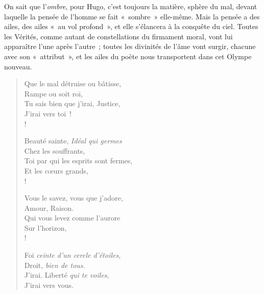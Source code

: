 \documentclass[french,twoside]{book} %
\begin{document}
\noindent On sait que l’\emph{ombre}, pour Hugo, c’est toujours la matière, sphère du mal, devant laquelle la pensée de l’homme se fait « sombre » elle-même. Mais la pensée a des ailes, des ailes « au vol profond », et elle s’élancera à la conquête du ciel. Toutes les Vérités, comme autant de constellations du firmament moral, vont lui apparaître l’une après l’autre ; toutes les divinités de l’âme vont surgir, chacune avec son « attribut », et les ailes du poète nous transportent dans cet Olympe nouveau.\par


\begin{verse}
Que le mal détruise ou bâtisse,\\
Rampe ou soit roi,\\
Tu sais bien que j’irai, Justice,\\
J’irai vers toi !\\!

Beauté sainte, \emph{Idéal qui germes}\\
Chez les souffrants,\\
Toi par qui les esprits sont fermes,\\
Et les cœurs grands,\\!

Vous le savez, vous que j’adore,\\
Amour, Raison.\\
Qui vous levez comme l’aurore\\
Sur l’horizon, \\!

Foi \emph{ceinte d’un cercle d’étoiles},\\
Droit, \emph{bien de tous.}\\
J’irai. Liberté \emph{qui te voiles},\\
J’irai vers vous.\\
\end{verse}
\end{document}
